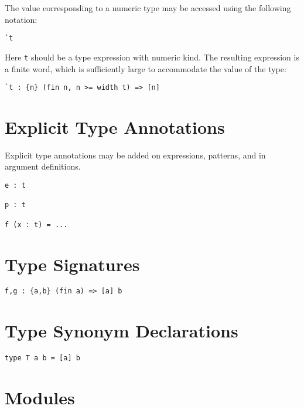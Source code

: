 The value corresponding to a numeric type may be accessed using the
following notation:

\begin{verbatim}
`t
\end{verbatim}

Here \texttt{t} should be a type expression with numeric kind. The
resulting expression is a finite word, which is sufficiently large to
accommodate the value of the type:

\begin{verbatim}
`t : {n} (fin n, n >= width t) => [n]
\end{verbatim}

\hypertarget{explicit-type-annotations}{%
\section{Explicit Type Annotations}\label{explicit-type-annotations}}

Explicit type annotations may be added on expressions, patterns, and in
argument definitions.

\begin{verbatim}
e : t

p : t

f (x : t) = ...
\end{verbatim}

\hypertarget{type-signatures}{%
\section{Type Signatures}\label{type-signatures}}

\begin{verbatim}
f,g : {a,b} (fin a) => [a] b
\end{verbatim}

\hypertarget{type-synonym-declarations}{%
\section{Type Synonym Declarations}\label{type-synonym-declarations}}

\begin{verbatim}
type T a b = [a] b
\end{verbatim}

\hypertarget{modules}{%
\section{Modules}\label{modules}}

